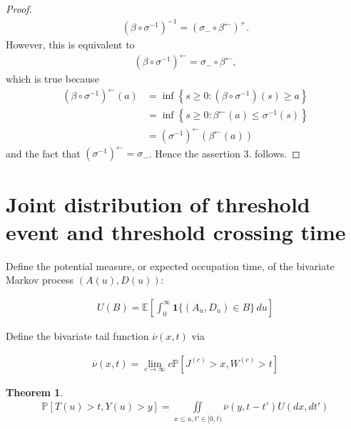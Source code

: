 \documentclass[12pt, a4paper]{article}
\newtheorem{theorem}[equation]{Theorem}
\newcommand{\ex}{\mathbb {E}}
\newcommand{\pr}{\mathbb {P}}
\newcommand{\1}{\mathbf 1}
\begin{document}
\begin{proof}
\begin{align*}
(\beta \circ \sigma^{-1})^{-1}=(\sigma_{-} \circ \beta^{\leftarrow})^{+}.
\end{align*}
However, this is equivalent to
\begin{align*}
(\beta \circ \sigma^{-1})^{\leftarrow} = \sigma_{-} \circ \beta^{\leftarrow},
\end{align*}
which is true because 
\begin{align*}
(\beta \circ \sigma^{-1})^{\leftarrow}(a)&=\inf \left\{s \geq 0: (\beta \circ \sigma^{-1})(s) \geq a\right\}\\
&=\inf \left\{ s \geq 0: \beta^{\leftarrow}(a) \leq \sigma^{-1}(s) \right\}\\
&=(\sigma^{-1})^{\leftarrow}(\beta^{\leftarrow}(a))
\end{align*}
and the fact that $(\sigma^{-1})^{\leftarrow}=\sigma_{-}$. Hence the assertion 3. follows.

\end{proof}





\section{Joint distribution of threshold event and threshold crossing time}

Define the potential measure, or expected occupation time, of the bivariate 
Markov process $(A(u),D(u))$:

\begin{align*}
U(B) = \ex \left[ \int_0^\infty \mathbf 1\{ (A_u, D_u) \in B\}\,du \right]
\end{align*}

Define the bivariate tail function $\overline \nu(x,t)$ via 

\begin{align}\label{eq:Tail_Function}
\overline \nu(x,t) = \lim_{c \to \infty} c \pr [J^{(c)} > x, W^{(c)} > t]
\end{align}


\begin{theorem}
\begin{align}
\pr [T(u) > t, Y(u) > y]
= \iint\limits_{x \le u, t' \in [0,t)} \overline \nu(y, t - t') U(dx, dt')
\end{align}
\end{theorem}
\end{document}
